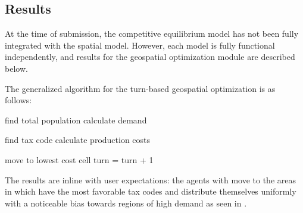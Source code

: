 \documentclass[12pt]{article}
\begin{document}
\subsection{Results}
At the time of submission, the competitive equilibrium model has not been fully integrated with the spatial model. However, each model is fully functional independently, and results for the geospatial optimization module are described below. \ 

The generalized algorithm for the turn-based geospatial optimization is as follows:

\begin{algorithmic}


				\State find total population
				\State calculate demand 

				\State find tax code
				\State calculate production costs

			\EndFor
			\State move to lowest cost cell
		\EndFor
		\State turn = turn + 1 
	\EndWhile
\end{algorithmic}

The results are inline with user expectations: the agents with move to the areas in which have the most favorable tax codes and distribute themselves uniformly with a noticeable bias towards regions of high demand as seen in . 
\end{document}
